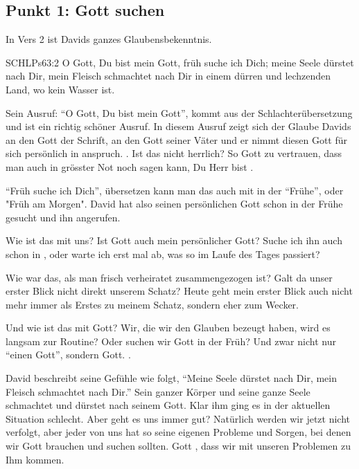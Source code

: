 \documentclass[14pt]{../../inc/mybib}
\begin{document}
    \subsection*{Punkt 1: Gott suchen}
    \begin{block}
    In Vers 2 ist Davids ganzes Glaubensbekenntnis. 
    \begin{bibelbox}{SCHL}{Ps}{63:2}
        O Gott, Du bist mein Gott, früh suche ich Dich; meine Seele dürstet nach Dir, mein Fleisch schmachtet nach Dir in einem dürren und lechzenden Land, wo kein Wasser ist.
    \end{bibelbox}
    Sein Ausruf: \enquote{O Gott, Du bist mein Gott}, kommt aus der Schlachterübersetzung und ist ein richtig schöner Ausruf. In diesem Ausruf zeigt sich der Glaube Davids an den Gott der Schrift, an den Gott seiner Väter und er nimmt diesen Gott für sich persönlich in anspruch. . Ist das nicht herrlich? So  Gott zu vertrauen, dass man auch in grösster Not noch sagen kann, Du Herr bist . 

    \enquote{Früh suche ich Dich}, übersetzen kann man das auch mit in der \enquote{Frühe}, oder "Früh am Morgen". David hat also seinen persönlichen Gott schon in der Frühe gesucht und ihn angerufen.
    \end{block}    

    \begin{block}
        Wie ist das mit uns? Ist Gott auch mein persönlicher Gott? Suche ich ihn auch schon in , oder warte ich erst mal ab, was so im Laufe des Tages passiert?

        Wie war das, als man frisch verheiratet zusammengezogen ist? Galt da unser erster Blick nicht direkt unserem Schatz? Heute geht mein erster Blick auch nicht mehr immer als Erstes zu meinem Schatz, sondern eher zum Wecker.

        Und wie ist das mit  Gott? Wir, die wir den Glauben bezeugt haben, wird es langsam zur Routine? Oder suchen wir Gott in der Früh? Und zwar nicht nur \enquote{einen Gott}, sondern  Gott. .

        David beschreibt seine Gefühle wie folgt, \enquote{Meine Seele dürstet nach Dir, mein Fleisch schmachtet nach Dir.} Sein ganzer Körper und seine ganze Seele schmachtet und dürstet nach seinem Gott. Klar ihm ging es in der aktuellen Situation schlecht. Aber geht es uns immer gut? Natürlich werden wir jetzt nicht verfolgt, aber jeder von uns hat so seine eigenen Probleme und Sorgen, bei denen wir Gott brauchen und suchen sollten. Gott , dass wir mit unseren Problemen zu Ihm kommen.
    \end{block}
\end{document}
